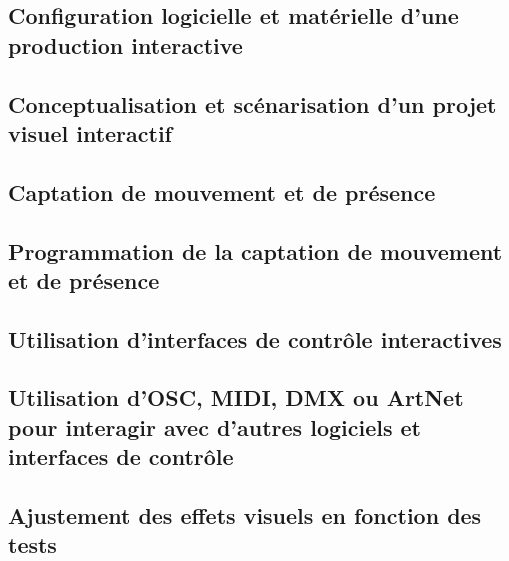 \documentclass[
]{book}
\begin{document}
\hypertarget{configuration-logicielle-et-matuxe9rielle-dune-production-interactive}{%
\subsection{Configuration logicielle et matérielle d'une production interactive}\label{configuration-logicielle-et-matuxe9rielle-dune-production-interactive}}

\hypertarget{conceptualisation-et-scuxe9narisation-dun-projet-visuel-interactif}{%
\subsection{Conceptualisation et scénarisation d'un projet visuel interactif}\label{conceptualisation-et-scuxe9narisation-dun-projet-visuel-interactif}}

\hypertarget{captation-de-mouvement-et-de-pruxe9sence}{%
\subsection{Captation de mouvement et de présence}\label{captation-de-mouvement-et-de-pruxe9sence}}

\hypertarget{programmation-de-la-captation-de-mouvement-et-de-pruxe9sence}{%
\subsection{Programmation de la captation de mouvement et de présence}\label{programmation-de-la-captation-de-mouvement-et-de-pruxe9sence}}

\hypertarget{utilisation-dinterfaces-de-contruxf4le-interactives}{%
\subsection{Utilisation d'interfaces de contrôle interactives}\label{utilisation-dinterfaces-de-contruxf4le-interactives}}

\hypertarget{utilisation-dosc-midi-dmx-ou-artnet-pour-interagir-avec-dautres-logiciels-et-interfaces-de-contruxf4le}{%
\subsection{Utilisation d'OSC, MIDI, DMX ou ArtNet pour interagir avec d'autres logiciels et interfaces de contrôle}\label{utilisation-dosc-midi-dmx-ou-artnet-pour-interagir-avec-dautres-logiciels-et-interfaces-de-contruxf4le}}

\hypertarget{ajustement-des-effets-visuels-en-fonction-des-tests}{%
\subsection{Ajustement des effets visuels en fonction des tests}\label{ajustement-des-effets-visuels-en-fonction-des-tests}}
\end{document}
